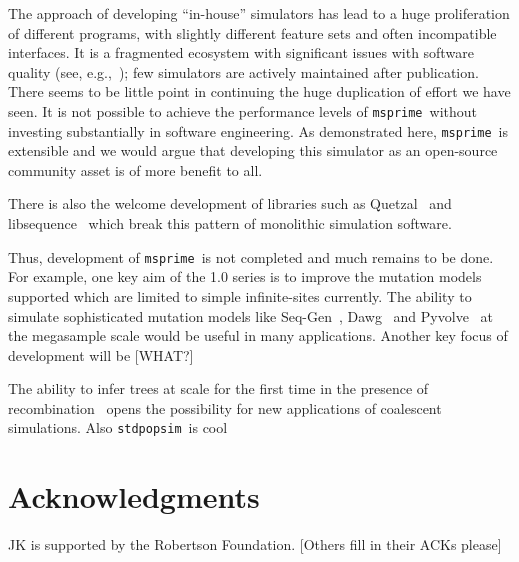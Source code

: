 \documentclass{article}
\newcommand{\msprime}[0]{\texttt{msprime}}
\newcommand{\stdpopsim}[0]{\texttt{stdpopsim}}
\newcommand{\msprime}[0]{{\texttt{msprime} }}
\newcommand{\stdpopsim}[0]{{\texttt{stdpopsim} }}
\begin{document}
The approach of developing ``in-house'' simulators
has lead to a huge proliferation of different programs, with
slightly different feature sets and often incompatible interfaces.
It is a fragmented ecosystem with significant issues with software
quality (see, e.g.,~\cite{yang2014critical});
few simulators are actively maintained after publication.
There seems to be little point
in continuing the huge duplication of effort we have seen.
It is not possible to achieve the performance levels of
\msprime\ without investing substantially in software engineering.
As demonstrated here, \msprime\ is extensible and we would argue
that developing this simulator as an open-source community asset
is of more benefit to all.

There is also the welcome development of libraries such as
Quetzal~\citep{becheler2019quetzal} and libsequence~\citep{thornton2014cpp}
which break this pattern of monolithic simulation software.


Thus, development of \msprime\ is not completed and much remains
to be done. For example, one key aim of the 1.0 series is to
improve the mutation models supported which are limited to
simple infinite-sites currently. The ability to simulate
sophisticated mutation models like Seq-Gen~\citep{rambaut1997seq},
Dawg~\citep{cartwright2005dna} and Pyvolve~\citep{spielman2015pyvolve} at the megasample scale would be
useful in many applications. Another key focus of development
will be [WHAT?]

The ability to infer trees at scale for the first time
in the presence of
recombination~\citep{harris2019database,kelleher2019inferring,
speidel2019method,tang2019genealogy}
opens the possibility for new applications of coalescent simulations.
Also \stdpopsim\ is cool~\citep{adrion2019community}

\section*{Acknowledgments}
JK is supported by the Robertson Foundation. [Others fill in their ACKs please]



\end{document}
